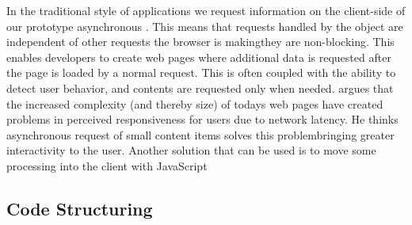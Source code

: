 In the traditional style of  applications we request information on
the client-side of our prototype asynchronous%
.
This means that requests handled by the  object
are independent of other requests the browser is making\dash{}they
are non-blocking. This enables developers to create web pages where additional
data is requested after the page is loaded by a normal  request.
This is often coupled with the ability to detect user behavior, and contents
are requested only when needed. \citet[pp.281--282]{stamey06} argues that
the increased complexity (and thereby size) of todays web pages have created
problems in perceived responsiveness for users due to network latency. He
thinks asynchronous request of small content items solves this
problem\dash{}bringing greater interactivity to the user. Another solution
that can be used is to move some processing into the client with
JavaScript \citep[]{jazayeri07}

\subsection{Code Structuring}
\label{section:implementation.architecture.code.structuring}


